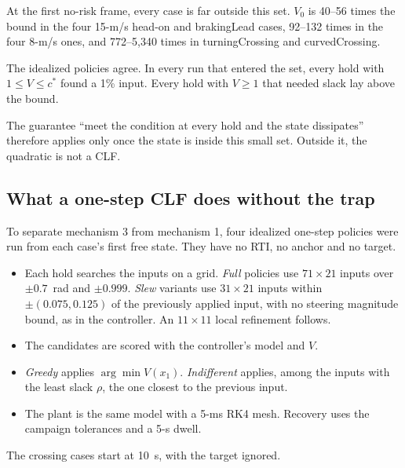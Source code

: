 \documentclass[11pt]{article}
\begin{document}
At the first no-risk frame, every case is far outside this set. $V_0$ is
40--56 times the bound in the four 15-m/s head-on and brakingLead cases, 92--132
times in the four 8-m/s ones, and 772--5{,}340 times in turningCrossing and
curvedCrossing.

The idealized policies agree. In every run that entered the set, every hold with
$1\le V\le c^*$ found a 1\% input. Every hold with $V\ge1$ that needed slack
lay above the bound.

The guarantee ``meet the condition at every hold and the state dissipates''
therefore applies only once the state is inside this small set. Outside it, the
quadratic is not a CLF.

\subsection{What a one-step CLF does without the trap}
To separate mechanism 3 from mechanism 1, four idealized one-step policies were
run from each case's first free state. They have no RTI, no anchor and no
target.
\begin{itemize}
\item Each hold searches the inputs on a grid. \emph{Full} policies use
$71\times21$ inputs over $\pm0.7$~rad and $\pm0.999$. \emph{Slew} variants use
$31\times21$ inputs within $\pm(0.075,0.125)$ of the previously applied input,
with no steering magnitude bound, as in the controller. An $11\times11$ local
refinement follows.
\item The candidates are scored with the controller's model and $V$.
\item \emph{Greedy} applies $\arg\min V(x_1)$. \emph{Indifferent} applies, among
the inputs with the least slack $\rho$, the one closest to the previous input.
\item The plant is the same model with a 5-ms RK4 mesh. Recovery uses the
campaign tolerances and a 5-s dwell.
\end{itemize}
The crossing cases start at 10~s, with the target ignored.
\end{document}
